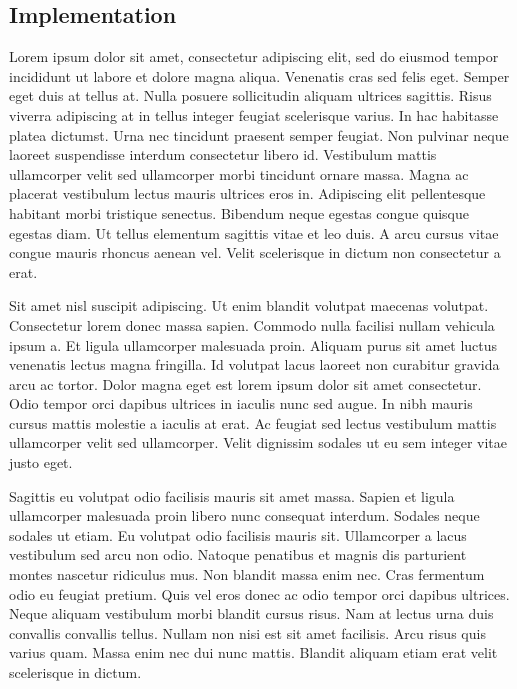 \documentclass[12pt]{article}
\begin{document}
\subsection{Implementation}
Lorem ipsum dolor sit amet, consectetur adipiscing elit, sed do eiusmod tempor incididunt ut labore et dolore magna aliqua. Venenatis cras sed felis eget. Semper eget duis at tellus at. Nulla posuere sollicitudin aliquam ultrices sagittis. Risus viverra adipiscing at in tellus integer feugiat scelerisque varius. In hac habitasse platea dictumst. Urna nec tincidunt praesent semper feugiat. Non pulvinar neque laoreet suspendisse interdum consectetur libero id. Vestibulum mattis ullamcorper velit sed ullamcorper morbi tincidunt ornare massa. Magna ac placerat vestibulum lectus mauris ultrices eros in. Adipiscing elit pellentesque habitant morbi tristique senectus. Bibendum neque egestas congue quisque egestas diam. Ut tellus elementum sagittis vitae et leo duis. A arcu cursus vitae congue mauris rhoncus aenean vel. Velit scelerisque in dictum non consectetur a erat.\par
Sit amet nisl suscipit adipiscing. Ut enim blandit volutpat maecenas volutpat. Consectetur lorem donec massa sapien. Commodo nulla facilisi nullam vehicula ipsum a. Et ligula ullamcorper malesuada proin. Aliquam purus sit amet luctus venenatis lectus magna fringilla. Id volutpat lacus laoreet non curabitur gravida arcu ac tortor. Dolor magna eget est lorem ipsum dolor sit amet consectetur. Odio tempor orci dapibus ultrices in iaculis nunc sed augue. In nibh mauris cursus mattis molestie a iaculis at erat. Ac feugiat sed lectus vestibulum mattis ullamcorper velit sed ullamcorper. Velit dignissim sodales ut eu sem integer vitae justo eget.\par
Sagittis eu volutpat odio facilisis mauris sit amet massa. Sapien et ligula ullamcorper malesuada proin libero nunc consequat interdum. Sodales neque sodales ut etiam. Eu volutpat odio facilisis mauris sit. Ullamcorper a lacus vestibulum sed arcu non odio. Natoque penatibus et magnis dis parturient montes nascetur ridiculus mus. Non blandit massa enim nec. Cras fermentum odio eu feugiat pretium. Quis vel eros donec ac odio tempor orci dapibus ultrices. Neque aliquam vestibulum morbi blandit cursus risus. Nam at lectus urna duis convallis convallis tellus. Nullam non nisi est sit amet facilisis. Arcu risus quis varius quam. Massa enim nec dui nunc mattis. Blandit aliquam etiam erat velit scelerisque in dictum.\par
\end{document}
